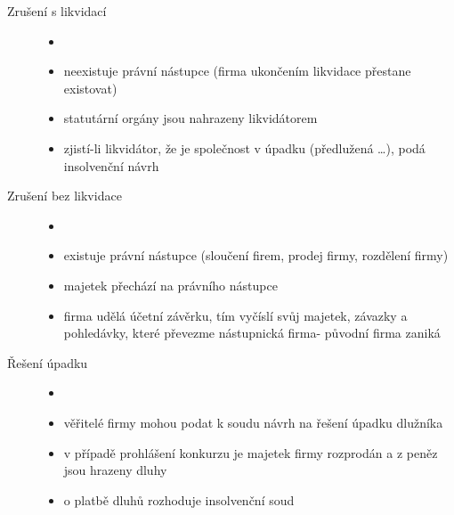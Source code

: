\begin{description}
        \item[Zrušení s likvidací]
            \begin{itemize}
                \item []
                \item neexistuje právní nástupce (firma ukončením likvidace přestane existovat)
                \item statutární orgány jsou nahrazeny likvidátorem
                \item zjistí-li likvidátor, že je společnost v úpadku (předlužená \ldots), podá insolvenční návrh
            \end{itemize}
        \item[Zrušení bez likvidace]
            \begin{itemize}
                \item []
                \item existuje právní nástupce (sloučení firem, prodej firmy, rozdělení firmy)
                \item majetek přechází na právního nástupce
                \item firma udělá účetní závěrku, tím vyčíslí svůj majetek, závazky a pohledávky, které převezme nástupnická firma- původní firma zaniká
            \end{itemize}
        \item[Řešení úpadku]
            \begin{itemize}
                \item []
                \item věřitelé firmy mohou podat k soudu návrh na řešení úpadku dlužníka
                \item v případě prohlášení konkurzu je majetek firmy rozprodán a z peněz jsou hrazeny dluhy
                \item o platbě dluhů rozhoduje insolvenční soud
            \end{itemize}
    \end{description}

